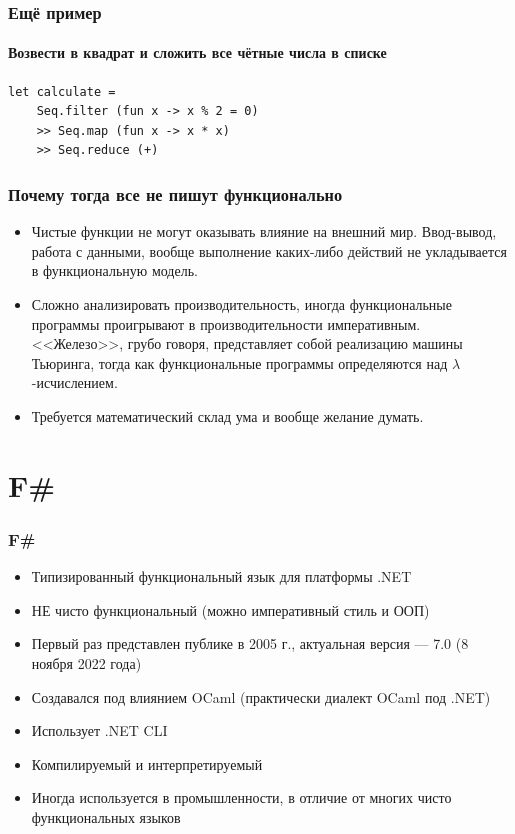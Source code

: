 \documentclass{../../slides-style}
\begin{document}
    \begin{frame}[fragile]
        \frametitle{Ещё пример}
        \framesubtitle{Возвести в квадрат и сложить все чётные числа в списке}
        \begin{verbatim}
let calculate = 
    Seq.filter (fun x -> x % 2 = 0) 
    >> Seq.map (fun x -> x * x) 
    >> Seq.reduce (+)
        \end{verbatim}
    \end{frame}

    \begin{frame}
        \frametitle{Почему тогда все не пишут функционально}
        \begin{itemize}
            \item Чистые функции не могут оказывать влияние на внешний мир. Ввод-вывод, работа с данными,
                    вообще выполнение каких-либо действий не укладывается в функциональную модель.
            \item Сложно анализировать производительность, иногда функциональные программы проигрывают
                    в производительности императивным. <<Железо>>, грубо говоря, представляет собой 
                    реализацию машины Тьюринга, тогда как функциональные программы определяются над
                    $\lambda$-исчислением.
            \item Требуется математический склад ума и вообще желание думать.
        \end{itemize}
    \end{frame}

    \section{F\#}

    \begin{frame}
        \frametitle{F\#}
        \begin{itemize}
            \item Типизированный функциональный язык для платформы .NET
            \item НЕ чисто функциональный (можно императивный стиль и ООП)
            \item Первый раз представлен публике в 2005 г., актуальная версия --- 7.0 (8 ноября 2022 года)
            \item Создавался под влиянием OCaml (практически диалект OCaml под .NET)
            \item Использует .NET CLI
            \item Компилируемый и интерпретируемый
            \item Иногда используется в промышленности, в отличие от многих чисто функциональных языков
        \end{itemize}
    \end{frame}
\end{document}
